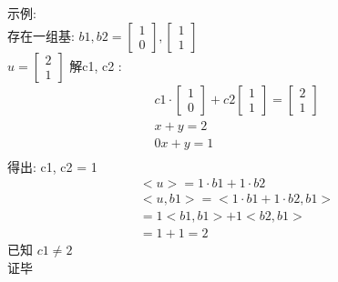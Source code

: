 \documentclass[12pt]{article}
\begin{document}
\begin{flushleft}
    示例: \\
    存在一组基:
    ${b1,b2} = \begin{bmatrix}
            1 \\
            0
        \end{bmatrix}, \begin{bmatrix}
            1 \\
            1
        \end{bmatrix}$ \\
    $u = \begin{bmatrix}
            2 \\
            1
        \end{bmatrix}$
    解c1, c2 : \\
    \begin{align}
        c1 \cdot \begin{bmatrix}
                     1 \\
                     0
                 \end{bmatrix} +  c2  \begin{bmatrix}
                                          1 \\
                                          1
                                      \end{bmatrix} = \begin{bmatrix}
                                                          2 \\
                                                          1
                                                      \end{bmatrix} \\
        x + y  = 2                                                   \\
        0x + y  =1                                                   \\
    \end{align}
    得出: c1, c2 = 1 \\
    \begin{align}
        <u> = 1 \cdot b1 + 1 \cdot b2           \\
        <u, b1> = <1 \cdot b1 + 1 \cdot b2, b1> \\
        = 1<b1, b1> + 1<b2,b1>                  \\
        = 1 + 1
        = 2
    \end{align}
    已知 $c1 \neq 2$ \\
    证毕

\end{flushleft}
\end{document}
